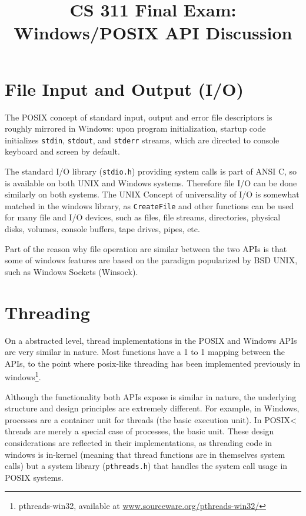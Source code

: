 \documentclass[letterpaper,10pt,titlepage]{article}
\author{\name}
\title{CS 311 Final Exam: Windows/POSIX API Discussion}
\begin{document}
\maketitle

\section{File Input and Output (I/O)}
The POSIX concept of standard input, output and error file descriptors is roughly
mirrored in Windows: upon program initialization, startup code initializes
\verb!stdin!, \verb!stdout!, and \verb!stderr! streams, which are directed to
console keyboard and screen by default.\cite{unixamg}

The standard I/O library (\verb!stdio.h!) providing system calls is part of
ANSI C, so is available on both UNIX and Windows systems. Therefore file I/O
can be done similarly on both systems. The UNIX Concept of universality of I/O
is somewhat matched in the windows library, as \verb~CreateFile~ and other
functions can be used for many file and I/O devices, such as files, file streams,
directories, physical disks, volumes, console buffers, tape drives, pipes, etc.
\cite{fmfw}

Part of the reason why file operation are similar between the two APIs is that
some of windows features are based on the paradigm popularized by BSD UNIX, such
as Windows Sockets (Winsock).

\section{Threading}
On a abstracted level, thread implementations in the POSIX and Windows APIs
are very similar in nature. Most functions have a 1 to 1 mapping between
the APIs, to the point where posix-like threading has been implemented previously
in windows\footnote{pthreads-win32, available at \url{www.sourceware.org/pthreads-win32/}}.

Although the functionality both APIs expose is similar in nature, the underlying
structure and design principles are extremely different. For example, in Windows,
processes are a container unit for threads (the basic execution unit). In POSIX<
threads are merely a special case of processes, the basic unit. These design
considerations are reflected in their implementations, as threading code
in windows is in-kernel (meaning that thread functions are in themselves system
calls) but a system library (\verb!pthreads.h!) that handles the system call usage
in POSIX systems.\cite{pvsthreads}
\end{document}
